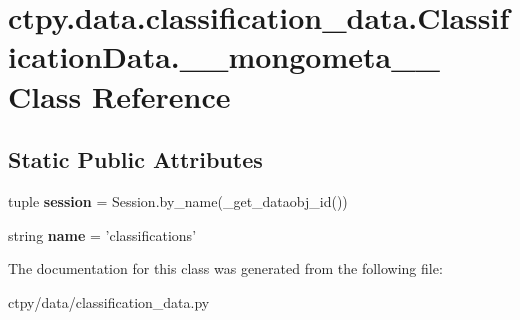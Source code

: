 \hypertarget{classctpy_1_1data_1_1classification__data_1_1_classification_data_1_1____mongometa____}{\section{ctpy.\-data.\-classification\-\_\-data.\-Classification\-Data.\-\_\-\-\_\-mongometa\-\_\-\-\_\- Class Reference}
\label{classctpy_1_1data_1_1classification__data_1_1_classification_data_1_1____mongometa____}
}
\subsection*{Static Public Attributes}
\begin{DoxyCompactItemize}
\item 
\hypertarget{classctpy_1_1data_1_1classification__data_1_1_classification_data_1_1____mongometa_____aa8bc6c920f85de290a36a9af39d8e058}{tuple {\bfseries session} = Session.\-by\-\_\-name(\-\_\-get\-\_\-dataobj\-\_\-id())}\label{classctpy_1_1data_1_1classification__data_1_1_classification_data_1_1____mongometa_____aa8bc6c920f85de290a36a9af39d8e058}

\item 
\hypertarget{classctpy_1_1data_1_1classification__data_1_1_classification_data_1_1____mongometa_____a532fb372e243ab64c046056e36b6eec2}{string {\bfseries name} = 'classifications'}\label{classctpy_1_1data_1_1classification__data_1_1_classification_data_1_1____mongometa_____a532fb372e243ab64c046056e36b6eec2}

\end{DoxyCompactItemize}


The documentation for this class was generated from the following file\-:\begin{DoxyCompactItemize}
\item 
ctpy/data/classification\-\_\-data.\-py\end{DoxyCompactItemize}
